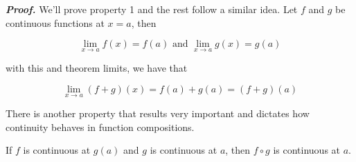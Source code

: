 \documentclass{report}
\begin{document}
\textit{\textbf{Proof.}} We'll prove property 1 and the rest follow a similar idea. Let $f$ and $g$ be continuous functions at $x=a$, then

$$
    \lim_{x\to a} f(x) = f(a) \text{ and } \lim_{x\to a} g(x) = g(a)
$$

with this and theorem limits, we have that

$$
    \lim_{x \to a} (f+g)(x) = f(a) + g(a) = (f+g)(a)
$$

There is another property that results very important and dictates how continuity behaves in function compositions.\\

\begin{thBox}
    If $f$ is continuous at $g(a)$ and $g$ is continuous at $a$, then $f \circ g$ is continuous at $a$.
\end{thBox}
\end{document}
